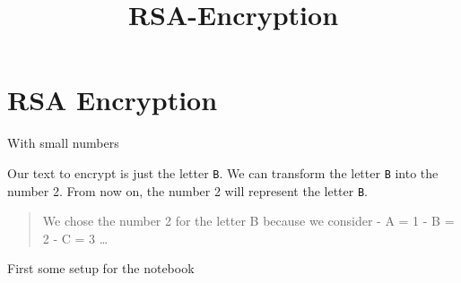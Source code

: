 \documentclass[11pt]{article}
\title{RSA-Encryption}
\begin{document}
    
    
    \maketitle
    
    

    
    \hypertarget{rsa-encryption}{%
\section{RSA Encryption}\label{rsa-encryption}}

With small numbers

Our text to encrypt is just the letter \texttt{B}. We can transform the
letter \texttt{B} into the number 2. From now on, the number 2 will
represent the letter \texttt{B}.

\begin{quote}
We chose the number 2 for the letter B because we consider - A = 1 - B =
2 - C = 3 \ldots{}
\end{quote}

    First some setup for the notebook
\end{document}
